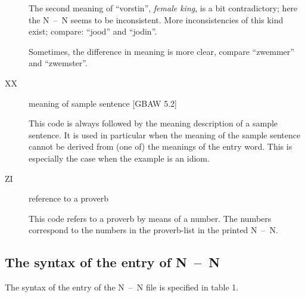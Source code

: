 \begin{description}
        The second meaning of ``vorstin'', {\em female king}, is a bit 
        contradictory; here the N~--~N seems to be inconsistent. More
        inconsistencies of this kind exist; compare: ``jood'' and ``jodin''.

        Sometimes, the difference in meaning is more clear, compare ``zwemmer''
        and ``zwemster''.

   \item [XX] meaning of sample sentence [GBAW 5.2]

        This code is always followed by the meaning description of a sample
        sentence. It is used in particular when the meaning of the sample 
        sentence cannot be derived from (one of) the meanings of the entry word.
        This is especially the case when the example is an idiom.

   \item [ZI] reference to a proverb
        
        This code refers to a proverb by means of a number. The numbers 
        correspond to the numbers in the proverb-list in the printed N~--~N.
\end{description}
\subsection{The syntax of the entry of N~--~N}

The syntax of the entry of the N~--~N file is specified in table 1.

